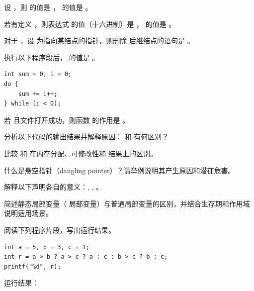 \documentclass[a4paper,11pt]{article}
\begin{document}
\examtitle


\anslines{0.1cm}

\q 设 ，则  的值是 \fillblank ， 的值是 \fillblank 。

\q 若有定义 ，则表达式  的值（十六进制）是 \fillblank ， 的值是 \fillblank 。

\q 对于 ，设  为指向某结点的指针，则删除  后继结点的语句是 \fillblank 。

\q 执行以下程序段后， 的值是 \fillblank 。
\begin{lstlisting}[language={[custom]C}]
int sum = 0, i = 0;
do {
    sum += i++;
} while (i < 0);
\end{lstlisting}

\q 若  且文件打开成功，则函数  的作用是 \fillblank 。


\q 分析以下代码的输出结果并解释原因： 和  有何区别？
\anslines{1.5cm}

\q 比较  和  在内存分配、可修改性和  结果上的区别。
\anslines{1.5cm}

\q 什么是悬空指针（dangling pointer）？请举例说明其产生原因和潜在危害。
\anslines{1.5cm}

\q 解释以下声明各自的意义：, , 。
\anslines{1.5cm}

\q 简述静态局部变量（ 局部变量）与普通局部变量的区别，并结合生存期和作用域说明适用场景。
\anslines{1.5cm}


阅读下列程序片段，写出运行结果。

\q
\begin{lstlisting}[language={[custom]C}]
int a = 5, b = 3, c = 1;
int r = a > b ? a > c ? a : c : b > c ? b : c;
printf("%d", r);
\end{lstlisting}
运行结果：\underline{\hspace{3cm}}
\end{document}

